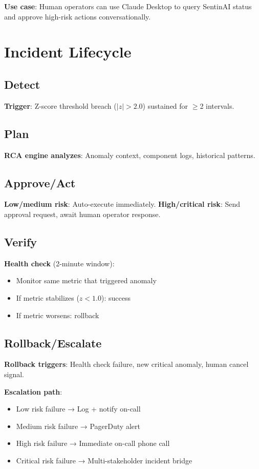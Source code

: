 \documentclass[11pt,a4paper]{article}
\begin{document}
\textbf{Use case}: Human operators can use Claude Desktop to query SentinAI status and approve high-risk actions conversationally.

\section{Incident Lifecycle}

\subsection{Detect}
\textbf{Trigger}: Z-score threshold breach ($|z| > 2.0$) sustained for $\geq$2 intervals.

\subsection{Plan}
\textbf{RCA engine analyzes}: Anomaly context, component logs, historical patterns.

\subsection{Approve/Act}
\textbf{Low/medium risk}: Auto-execute immediately.
\textbf{High/critical risk}: Send approval request, await human operator response.

\subsection{Verify}
\textbf{Health check} (2-minute window):
\begin{itemize}
    \item Monitor same metric that triggered anomaly
    \item If metric stabilizes ($z < 1.0$): success
    \item If metric worsens: rollback
\end{itemize}

\subsection{Rollback/Escalate}
\textbf{Rollback triggers}: Health check failure, new critical anomaly, human cancel signal.

\textbf{Escalation path}:
\begin{itemize}
    \item Low risk failure → Log + notify on-call
    \item Medium risk failure → PagerDuty alert
    \item High risk failure → Immediate on-call phone call
    \item Critical risk failure → Multi-stakeholder incident bridge
\end{itemize}
\end{document}
